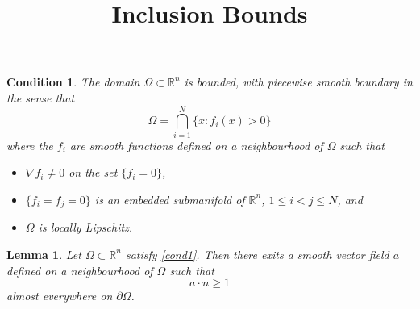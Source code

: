\documentclass{article}
\title{Inclusion Bounds}
\newcommand{\R}{\mathbb{R}}
\newtheorem{lemma}{Lemma}\newcommand{\lemmaautorefname}{Lemma}
\newtheorem{cond}{Condition}\newcommand{\condautorefname}{Condition}
\begin{document}
\maketitle
\begin{cond}
\label{cond1}
The domain $\Omega \subset \R^n$ is bounded, with piecewise smooth boundary in the sense that
\[
\Omega = \bigcap_{i=1}^N\{x : f_i(x) > 0\}
\]
where the $f_i$ are smooth functions defined on a neighbourhood of $\bar\Omega$ such that
\begin{itemize}
\item $\nabla f_i \ne 0$ on the set $\{f_i = 0\}$,
\item $\{f_i = f_j = 0\}$ is an embedded submanifold of $\R^n$, $1 \le i < j \le N$, and
\item $\Omega$ is locally Lipschitz.
\end{itemize}
\end{cond}

\begin{lemma}
\label{lem22}
Let $\Omega \subset \R^n$ satisfy \autoref{cond1}.
Then there exits a smooth vector field $a$ defined on a neighbourhood of $\bar\Omega$ such that
\[
a \cdot n \ge 1
\]
almost everywhere on $\partial \Omega$.
\end{lemma}
\end{document}
